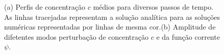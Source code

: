\documentclass[a4paper,portuges,12pt]{article}
\begin{document}
 \begin{figure}[h!]
 	\begin{center}
 		\hspace{0.7cm}
 	\end{center}
	\caption{(a) Perfis de concentração $c$ médios para diversos passos
	de tempo. As linhas tracejadas representam a solução analítica para
	as soluções numéricas representadas por linhas de mesma cor.(b)
	Amplitude de difetentes modos perturbação de concentração $c$ e da
	função corrente $\psi$.} 
	\label{fig:chem1} 
 \end{figure}
\end{document}
